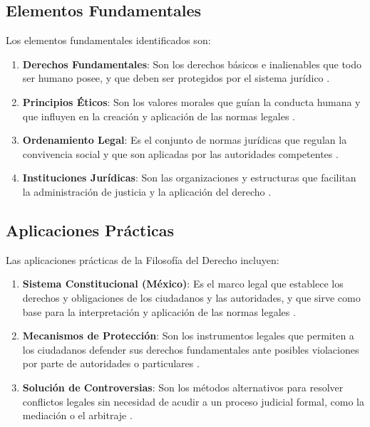 \documentclass[
	spanish, %
	letterpaper, oneside
]{article}
\begin{document}
\subsection{Elementos Fundamentales}

Los elementos fundamentales identificados son:

\begin{enumerate}
	\item \textbf{Derechos Fundamentales}: Son los derechos básicos e inalienables que todo ser humano posee, y que deben ser protegidos por el sistema jurídico \cite{noauthor_constitucion_nodate,generales_ley_2021}.
	\item \textbf{Principios Éticos}: Son los valores morales que guían la conducta humana y que influyen en la creación y aplicación de las normas legales \cite{finnis_estudios_2017,lovon_manual_2020}.
	\item \textbf{Ordenamiento Legal}: Es el conjunto de normas jurídicas que regulan la convivencia social y que son aplicadas por las autoridades competentes \cite{rojas_gonzalez_filosofia_derecho_2018}.
	\item \textbf{Instituciones Jurídicas}: Son las organizaciones y estructuras que facilitan la administración de justicia y la aplicación del derecho \cite{gandara_ley_2015}.
\end{enumerate}

\subsection{Aplicaciones Prácticas}

Las aplicaciones prácticas de la Filosofía del Derecho incluyen:

\begin{enumerate}
	\item \textbf{Sistema Constitucional (México)}: Es el marco legal que establece los derechos y obligaciones de los ciudadanos y las autoridades, y que sirve como base para la interpretación y aplicación de las normas legales \cite{noauthor_constitucion_nodate}.
	\item \textbf{Mecanismos de Protección}: Son los instrumentos legales que permiten a los ciudadanos defender sus derechos fundamentales ante posibles violaciones por parte de autoridades o particulares \cite{generales_ley_2021,de_victimas_ley_2013,franzoni_acevedo_ley_2017}.
	\item \textbf{Solución de Controversias}: Son los métodos alternativos para resolver conflictos legales sin necesidad de acudir a un proceso judicial formal, como la mediación o el arbitraje \cite{gandara_ley_2015}.
\end{enumerate}
\end{document}
